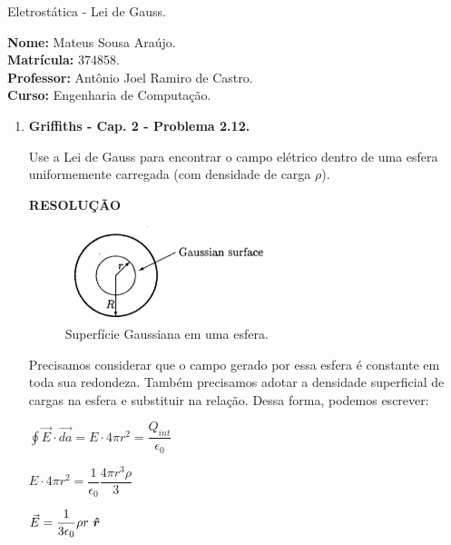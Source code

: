 \documentclass[11pt,a4paper]{article}
\newcommand{\mat}[1]{\mbox{\boldmath{$#1$}}}
\begin{document}
	\begin{center}
		\Large Eletrostática - Lei de Gauss. 
	\end{center}

\begin{flushleft}
\textbf{Nome:} Mateus Sousa Araújo. \\
\textbf{Matrícula:} 374858. \\
\textbf{Professor:} Antônio Joel Ramiro de Castro. \\
\textbf{Curso:} Engenharia de Computação. \\
\end{flushleft}

\begin{enumerate}

\item \textbf{Griffiths - Cap. 2 - Problema 2.12.}

Use a Lei de Gauss para encontrar o campo elétrico dentro de uma esfera uniformemente carregada (com densidade de carga $\rho$). 

\textbf{RESOLUÇÃO}

\begin{figure}[h]	
\centering %
\includegraphics[width=6cm]{Selection_077.jpg} 
\caption{Superfície Gaussiana em uma esfera.}
\end{figure}

Precisamos considerar que o campo gerado por essa esfera é constante em toda sua redondeza. Também precisamos adotar a densidade superficial de cargas na esfera e substituir na relação. Dessa forma, podemos escrever:

\begin{center}
$\displaystyle\oint \vec{E} \cdot \vec{da} = E \cdot 4\pi r^2 = \displaystyle\dfrac{Q_{int}}{\epsilon_0} $
\end{center}

\begin{center}
$E \cdot 4\pi r^2 = \displaystyle\dfrac{1}{\epsilon_0} \displaystyle\dfrac{4\pi r^3 \rho}{3} $
\end{center}

\begin{center}
$\vec{E} = \displaystyle\dfrac{1}{3\epsilon_0} \rho r \ \mat{\hat{r}} $
\end{center}


\end{enumerate}
\end{document}
